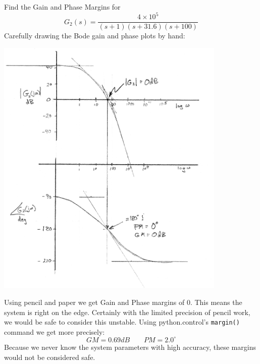 \begin{ExampleSmall}
Find the Gain and Phase Margins for
\[
G_2(s) = \frac  {4\times10^5}  {(s+1)(s+31.6)(s+100)}
\]
Carefully drawing the Bode gain and phase plots by hand:

\includegraphics[width=110mm]{figs06/01063.png}

Using pencil and paper we get Gain and Phase margins of 0.  This means the system is right on the edge.  Certainly with
the limited precision of pencil work, we would be safe to consider this unstable.
Using python.control's {\tt  margin()} command we get more precisely:
\[
GM = 0.69dB \qquad PM = 2.0^\circ
\]
Because we never know the system parameters with high accuracy, these margins would not be considered safe.
\end{ExampleSmall}

























